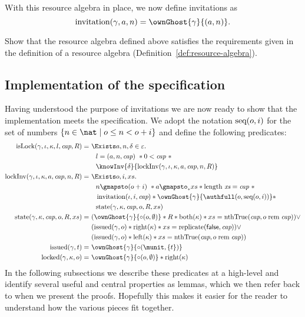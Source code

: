 With this resource algebra in place, we now define invitations as
\[
  \invitation(\gamma, a, n) = \ownGhost{\gamma}{(a, n)}.
\]

\begin{exercise}
  Show that the resource algebra defined above satisfies the requirements
  given in the definition of a resource algebra
  (Definition~\ref{def:resource-algebra}).
\end{exercise}


\subsection{Implementation of the specification}
\label{sec:implementation-spec}

Having understood the purpose of invitations we are now ready to show that the
implementation meets the specification. We adopt the notation $\text{seq}(o, i)$ for the
set of numbers $\{ n \in \nat \mid o \leq n < o + i \}$ and define the following
predicates:
\begin{align*}
  \isLockA =& \ 
     \Exists a, n, \delta \in \varepsilon. \\
        & \quad l = (a, n, \Cap)\ \ast 0 < \Cap\ \ast \\
        & \quad \knowInv{\delta}{\lockInv(\gamma, \iota, \kappa, a, \Cap, n, R)} \\
  \lockInv(\gamma, \iota, \kappa, a, \Cap, n, R) =& \
    \Exists o, i, xs. \\
        & \quad n \gmapsto (o + i) \ \ast a \gmapsto_{*} xs \ast \length\ \xs = \Cap\ \ast \\
        & \quad \invitation(\iota, i, \Cap) \ast \ownGhost{\gamma}{\authfull ( o, \seq(o, i))} \ast \\
        & \quad \text{state}(\gamma, \kappa, \Cap, o, R, xs) \\
  \text{state}(\gamma, \kappa, \Cap, o, R, xs) =&\ 
        (\ownGhost{\gamma}{\circ (o, \emptyset)} \ast R \ast \bothK \ast xs = \nthTrueCapO) \lor \\
        & \ (\issuedA \ast \rightK \ast xs = \replicate(\false, \Cap)) \lor \\
        & \ (\issuedA \ast \leftK \ast xs = \nthTrueCapO) \\
  \issued(\gamma, t) =&\ \ownGhost{\gamma}{\circ(\munit, \{ t \})} \\
  \lockedGKO =&\ \ownGhost{\gamma}{\circ(o, \emptyset)} \ast \rightK
\end{align*}
In the following subsections we describe these predicates
at a high-level and identify several useful
and central properties as lemmas, which we then refer back to when we present the proofs.
Hopefully this makes it easier for the reader to understand how the various
pieces fit together.

